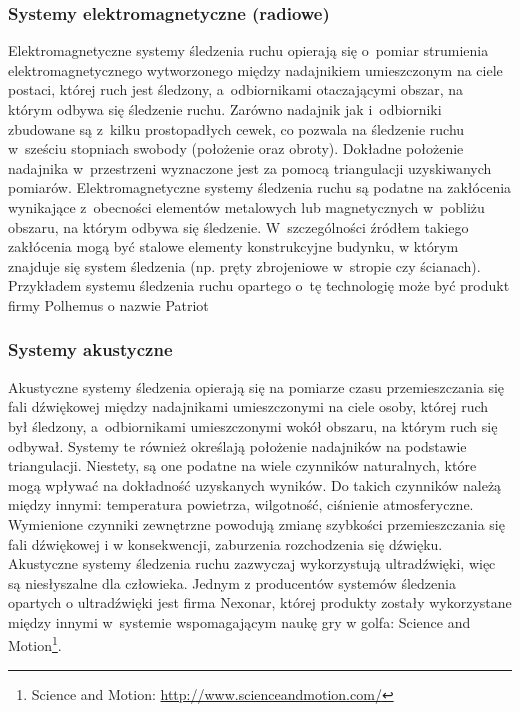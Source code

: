 \subsubsection*{Systemy elektromagnetyczne (radiowe)}
Elektromagnetyczne systemy śledzenia ruchu opierają się o~pomiar strumienia elektromagnetycznego wytworzonego między nadajnikiem umieszczonym na ciele postaci, której ruch jest śledzony, a~odbiornikami otaczającymi obszar, na którym odbywa się śledzenie ruchu. Zarówno nadajnik jak i~odbiorniki zbudowane są z~kilku prostopadłych cewek, co pozwala na śledzenie ruchu w~sześciu stopniach swobody (położenie oraz obroty). Dokładne położenie nadajnika w~przestrzeni wyznaczone jest za pomocą triangulacji uzyskiwanych pomiarów. Elektromagnetyczne systemy śledzenia ruchu są podatne na zakłócenia wynikające z~obecności elementów metalowych lub magnetycznych w~pobliżu obszaru, na którym odbywa się śledzenie. W~szczególności źródłem  takiego zakłócenia mogą być stalowe elementy konstrukcyjne budynku, w którym znajduje się system śledzenia (np. pręty zbrojeniowe w~stropie czy ścianach). Przykładem systemu śledzenia ruchu opartego o~tę technologię może być produkt firmy Polhemus o nazwie Patriot
									
\subsubsection*{Systemy akustyczne}
Akustyczne systemy śledzenia opierają się na pomiarze czasu przemieszczania się fali dźwiękowej między nadajnikami umieszczonymi na ciele osoby, której ruch był śledzony, a~odbiornikami umieszczonymi wokół obszaru, na którym ruch się odbywał. Systemy te również określają położenie nadajników na podstawie triangulacji. Niestety, są one podatne na wiele czynników naturalnych, które mogą wpływać na dokładność uzyskanych wyników. Do takich czynników należą między innymi: temperatura powietrza, wilgotność, ciśnienie atmosferyczne. Wymienione czynniki zewnętrzne powodują zmianę szybkości przemieszczania się fali dźwiękowej i w konsekwencji, zaburzenia rozchodzenia się dźwięku. Akustyczne systemy śledzenia ruchu zazwyczaj wykorzystują ultradźwięki, więc są niesłyszalne dla człowieka. Jednym z producentów systemów śledzenia opartych o ultradźwięki jest firma Nexonar, której produkty zostały wykorzystane między innymi w~systemie wspomagającym naukę gry w golfa: Science and Motion\footnote{Science and Motion: \url{http://www.scienceandmotion.com/}}.
									
